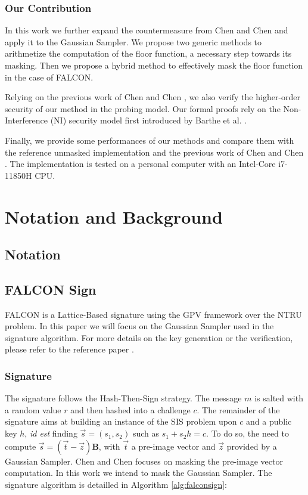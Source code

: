 \documentclass[runningheads]{llncs}
\begin{document}
\subsubsection{Our Contribution}
In this work we further expand the countermeasure from Chen and Chen \cite{Chen_Chen_2024} and apply it to the Gaussian Sampler. We propose two generic methods to arithmetize the computation of the floor function, a necessary step towards its masking. Then we propose a hybrid method to effectively mask the floor function in the case of FALCON.

\medskip

Relying on the previous work of Chen and Chen \cite{Chen_Chen_2024}, we also verify the higher-order security of our method in the probing model. Our formal proofs rely on the Non-Interference (NI) security model first introduced by Barthe et al. \cite{10.1145/2976749.2978427}.

\medskip

Finally, we provide some performances of our methods and compare them with the reference unmasked implementation and the previous work of Chen and Chen \cite{Chen_Chen_2024}. The implementation is tested on a personal computer with an Intel-Core i7-11850H CPU.


\section{Notation and Background}\label{sec:background}
\subsection{Notation}
\subsection{FALCON Sign}
FALCON \cite{prest2020falcon} is a Lattice-Based signature using the GPV framework over the NTRU problem. In this paper we will focus on the Gaussian Sampler used in the signature algorithm. For more details on the key generation or the verification, please refer to the reference paper \cite{prest2020falcon}.

\subsubsection{Signature} The signature follows the Hash-Then-Sign strategy. The message $m$ is salted with a random value $r$ and then hashed into a challenge $c$. The remainder of the signature aims at building an instance of the SIS problem upon $c$ and a public key $h$, \emph{id est} finding $\vec{s} =(s_1,s_2)$ such as $s_1 + s_2 h = c$. To do so, the need to compute $\vec{s} = (\vec{t}-\vec{z})\mathbf{B}$, with $\vec{t}$ a pre-image vector and $\vec{z}$ provided by a Gaussian Sampler. Chen and Chen \cite{Chen_Chen_2024} focuses on masking the pre-image vector computation. In this work we intend to mask the Gaussian Sampler. The signature algorithm is detailled in Algorithm \ref{alg:falconsign}:
\end{document}
